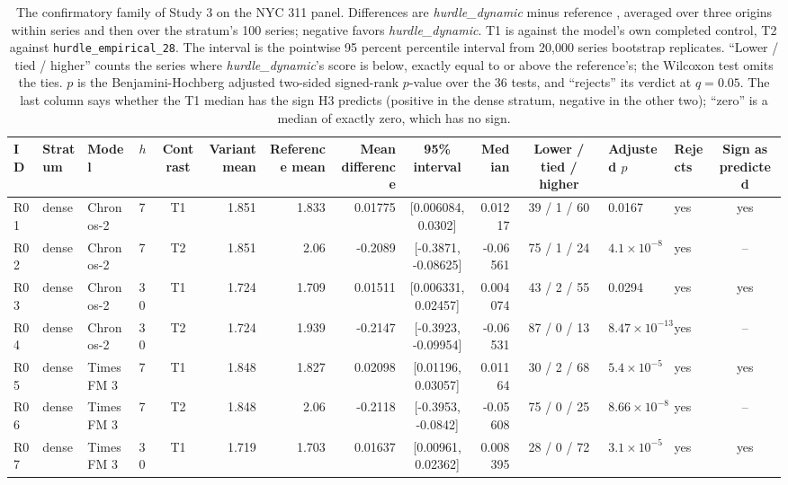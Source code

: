\begin{table}
\centering\scriptsize\setlength{\tabcolsep}{2.4pt}
\caption{The confirmatory family of Study 3 on the NYC 311 panel. Differences are \emph{hurdle\_dynamic}
minus reference \qs{}, averaged over three origins within series and then over the stratum's 100 series;
negative favors \emph{hurdle\_dynamic}. T1 is against the model's own completed control, T2 against
\texttt{hurdle\_empirical\_28}. The interval is the pointwise 95 percent percentile interval from 20,000
series bootstrap replicates. ``Lower / tied / higher'' counts the series where \emph{hurdle\_dynamic}'s score
is below, exactly equal to or above the reference's; the Wilcoxon test omits the ties. $p$ is the
Benjamini-Hochberg adjusted two-sided signed-rank $p$-value over the 36 tests, and ``rejects'' its verdict
at $q = 0.05$. The last column says whether the T1 median has the sign H3 predicts (positive in the dense
stratum, negative in the other two); ``zero'' is a median of exactly zero, which has no sign.}
\label{tab:s3family}
\begin{tabular}{llllcrrrcrcllc}
\toprule
ID & Stratum & Model & $h$ & Contrast & Variant mean & Reference mean & Mean difference & 95\% interval & Median & Lower / tied / higher & Adjusted $p$ & Rejects & Sign as predicted \\
\midrule
R01 & dense & Chronos-2 & 7 & T1 & 1.851 & 1.833 & 0.01775 & [0.006084, 0.0302] & 0.01217 & 39 / 1 / 60 & 0.0167 & yes & yes \\
R02 & dense & Chronos-2 & 7 & T2 & 1.851 & 2.06 & -0.2089 & [-0.3871, -0.08625] & -0.06561 & 75 / 1 / 24 & $4.1 \times 10^{-8}$ & yes & -- \\
R03 & dense & Chronos-2 & 30 & T1 & 1.724 & 1.709 & 0.01511 & [0.006331, 0.02457] & 0.004074 & 43 / 2 / 55 & 0.0294 & yes & yes \\
R04 & dense & Chronos-2 & 30 & T2 & 1.724 & 1.939 & -0.2147 & [-0.3923, -0.09954] & -0.06531 & 87 / 0 / 13 & $8.47 \times 10^{-13}$ & yes & -- \\
R05 & dense & TimesFM 3 & 7 & T1 & 1.848 & 1.827 & 0.02098 & [0.01196, 0.03057] & 0.01164 & 30 / 2 / 68 & $5.4 \times 10^{-5}$ & yes & yes \\
R06 & dense & TimesFM 3 & 7 & T2 & 1.848 & 2.06 & -0.2118 & [-0.3953, -0.0842] & -0.05608 & 75 / 0 / 25 & $8.66 \times 10^{-8}$ & yes & -- \\
R07 & dense & TimesFM 3 & 30 & T1 & 1.719 & 1.703 & 0.01637 & [0.00961, 0.02362] & 0.008395 & 28 / 0 / 72 & $3.1 \times 10^{-5}$ & yes & yes \\

\end{tabular}
\end{table}
